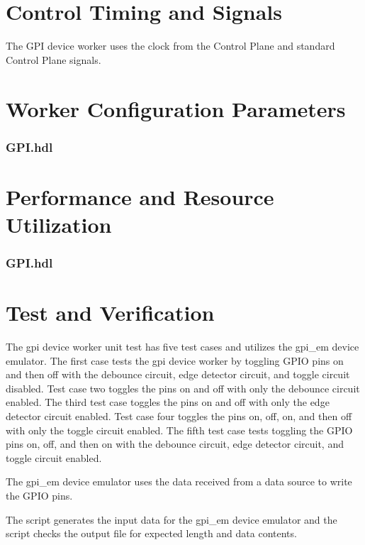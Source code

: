 \documentclass{article}
\def\comp{GPI}
\begin{document}
\section*{Control Timing and Signals}
\begin{flushleft}

The GPI device worker uses the clock from the Control Plane and standard Control Plane signals.

\end{flushleft}

\begin{landscape}
\section*{Worker Configuration Parameters}
\subsubsection*{\comp.hdl}

\section*{Performance and Resource Utilization}
\subsubsection*{\comp.hdl}

\end{landscape}



\section*{Test and Verification}
\normalsize

\begin{flushleft}

The gpi device worker unit test has five test cases and utilizes the gpi\_em device emulator. The first case tests the gpi device worker by toggling GPIO pins on and then off with the debounce circuit, edge detector circuit, and toggle circuit disabled. Test case two toggles the pins on and off with only the debounce circuit enabled. The third test case toggles the pins on and off with only the edge detector circuit enabled. Test case four toggles the pins on, off, on, and then off with only the toggle circuit enabled. The fifth test case tests toggling the GPIO pins on, off, and then on with the debounce circuit, edge detector circuit, and toggle circuit enabled. \newline

The gpi\_em device emulator uses the data received from a data source to write the GPIO pins. \newline

The  script generates the input data for the gpi\_em device emulator and the  script checks the output file for expected length and
data contents.

\end{flushleft}
\end{document}

